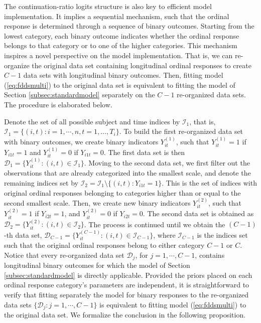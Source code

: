 The continuation-ratio logits structure is also key to efficient model implementation. It implies 
a sequential mechanism, such that the ordinal response is determined through a sequence of binary 
outcomes. Starting from the lowest category, each binary outcome indicates whether the ordinal 
response belongs to that category or to one of the higher categories. This mechanism inspires 
a novel perspective on the model implementation. That is, we can re-organize the original data 
set containing longitudinal ordinal responses to create $C-1$ data sets with longitudinal 
binary outcomes. Then, fitting model (\ref{eq:fddsmulti}) to the original data set is equivalent 
to fitting the model of Section \ref{subsec:standardmodel} separately on the $C-1$ re-organized 
data sets. The procedure is elaborated below. 


Denote the set of all possible subject and time indices by $\boldsymbol{\mathcal{I}}_1$, 
that is, $\boldsymbol{\mathcal{I}}_1=\{(i,t):i=1,\cdots,n,t=1,\dots,T_i\}$. To build the first 
re-organized data set with binary outcomes, we create binary indicators $Y^{(1)}_{it}$, such 
that $Y^{(1)}_{it}=1$ if $Y_{i1t}=1$ and $Y^{(1)}_{it}=0$ if $Y_{i1t}=0$. The first 
data set is then $\boldsymbol{\mathcal{D}}_1 = \{Y^{(1)}_{it}: (i,t)\in\boldsymbol{\mathcal{I}}_1\}$.  
Moving to the second data set, we first filter out the observations that are already 
categorized into the smallest scale, and denote the remaining indices set 
by $\boldsymbol{\mathcal{I}}_2=\boldsymbol{\mathcal{I}}_1\setminus\{(i,t):Y_{i1t}=1\}$. 
This is the set of indices with original ordinal responses belonging to categories higher 
than or equal to the second smallest scale. Then, we create new binary indicators $Y^{(2)}_{it}$, 
such that $Y^{(2)}_{it}=1$ if $Y_{i2t}=1$, and $Y^{(2)}_{it}=0$ if $Y_{i2t}=0$. 
The second data set is obtained as $\boldsymbol{\mathcal{D}}_2 = \{Y^{(2)}_{it}: (i,t)\in\boldsymbol{\mathcal{I}}_2\}$. The process is continued until we obtain the 
$(C-1)$-th data set, 
$\boldsymbol{\mathcal{D}}_{C-1}=\{Y^{(C-1)}_{it}: (i,t)\in\boldsymbol{\mathcal{I}}_{C-1}\}$, 
where $\boldsymbol{\mathcal{I}}_{C-1}$ is the indices set such that the original ordinal 
responses belong to either category $C-1$ or $C$. Notice that every re-organized data 
set $\boldsymbol{\mathcal{D}}_{j}$, for $j=1,\cdots,C-1$, contains longitudinal binary 
outcomes for which the model of Section \ref{subsec:standardmodel} is directly applicable. 
Provided the priors placed on each ordinal response category's parameters are independent,
it is straightforward to verify that fitting separately the model for binary responses to the 
re-organized data sets $\{\boldsymbol{\mathcal{D}}_{j}: j=1,\cdots,C-1\}$ is
equivalent to fitting model (\ref{eq:fddsmulti}) to the original data set.
We formalize the conclusion in the following proposition.

